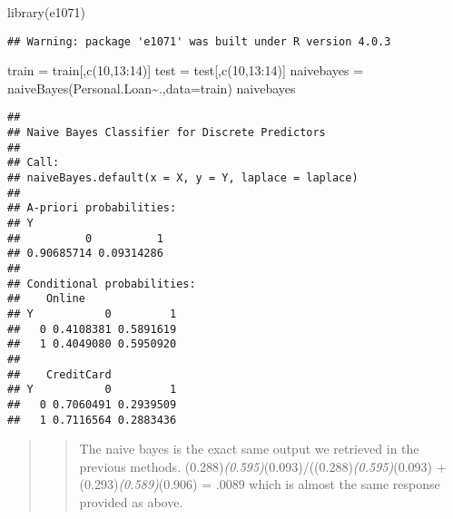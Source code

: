 \documentclass[
]{article}
\newenvironment{Shaded}{\begin{snugshade}}{\end{snugshade}}
\newcommand{\AttributeTok}[1]{\textcolor[rgb]{0.77,0.63,0.00}{#1}}
\newcommand{\DecValTok}[1]{\textcolor[rgb]{0.00,0.00,0.81}{#1}}
\newcommand{\FunctionTok}[1]{\textcolor[rgb]{0.00,0.00,0.00}{#1}}
\newcommand{\NormalTok}[1]{#1}
\newcommand{\OtherTok}[1]{\textcolor[rgb]{0.56,0.35,0.01}{#1}}
\newcommand{\SpecialCharTok}[1]{\textcolor[rgb]{0.00,0.00,0.00}{#1}}
\newcommand{\StringTok}[1]{\textcolor[rgb]{0.31,0.60,0.02}{#1}}
\begin{document}
\begin{Shaded}
\begin{Highlighting}[]
\FunctionTok{library}\NormalTok{(}\StringTok{\textquotesingle{}e1071\textquotesingle{}}\NormalTok{)}
\end{Highlighting}
\end{Shaded}

\begin{verbatim}
## Warning: package 'e1071' was built under R version 4.0.3
\end{verbatim}

\begin{Shaded}
\begin{Highlighting}[]
\NormalTok{train }\OtherTok{=}\NormalTok{ train[,}\FunctionTok{c}\NormalTok{(}\DecValTok{10}\NormalTok{,}\DecValTok{13}\SpecialCharTok{:}\DecValTok{14}\NormalTok{)]}
\NormalTok{test }\OtherTok{=}\NormalTok{ test[,}\FunctionTok{c}\NormalTok{(}\DecValTok{10}\NormalTok{,}\DecValTok{13}\SpecialCharTok{:}\DecValTok{14}\NormalTok{)]}
\NormalTok{naivebayes }\OtherTok{=} \FunctionTok{naiveBayes}\NormalTok{(Personal.Loan}\SpecialCharTok{\textasciitilde{}}\NormalTok{.,}\AttributeTok{data=}\NormalTok{train)}
\NormalTok{naivebayes}
\end{Highlighting}
\end{Shaded}

\begin{verbatim}
## 
## Naive Bayes Classifier for Discrete Predictors
## 
## Call:
## naiveBayes.default(x = X, y = Y, laplace = laplace)
## 
## A-priori probabilities:
## Y
##          0          1 
## 0.90685714 0.09314286 
## 
## Conditional probabilities:
##    Online
## Y           0         1
##   0 0.4108381 0.5891619
##   1 0.4049080 0.5950920
## 
##    CreditCard
## Y           0         1
##   0 0.7060491 0.2939509
##   1 0.7116564 0.2883436
\end{verbatim}

\begin{quote}
\begin{quote}
The naive bayes is the exact same output we retrieved in the previous
methods. (0.288)\emph{(0.595)}(0.093)/((0.288)\emph{(0.595)}(0.093) +
(0.293)\emph{(0.589)}(0.906) = .0089 which is almost the same response
provided as above.
\end{quote}
\end{quote}
\end{document}
